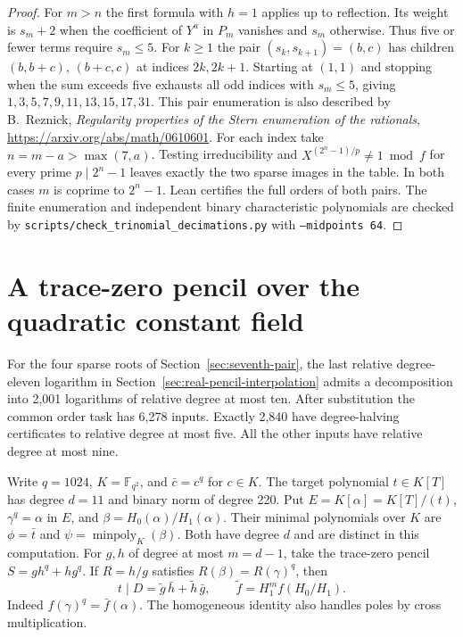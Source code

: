\documentclass[11pt]{article}
\begin{document}
\begin{proof}
For \(m>n\) the first formula with \(h=1\) applies up to reflection.
Its weight is \(s_m+2\) when the coefficient of \(Y^a\) in \(P_m\)
vanishes and \(s_m\) otherwise. Thus five or fewer terms require
\(s_m\le5\). For \(k\ge1\) the pair \((s_k,s_{k+1})=(b,c)\) has
children \((b,b+c)\), \((b+c,c)\) at indices \(2k,2k+1\). Starting
at \((1,1)\) and stopping when the sum exceeds five exhausts all odd
indices with \(s_m\le5\), giving
\(1,3,5,7,9,11,13,15,17,31\). This pair enumeration is also described
by B.~Reznick, \emph{Regularity properties of the Stern enumeration of
the rationals}, \url{https://arxiv.org/abs/math/0610601}.
For each index take \(n=m-a>\max(7,a)\). Testing irreducibility and
\(X^{(2^n-1)/p}\ne1\bmod f\) for every prime \(p\mid 2^n-1\) leaves
exactly the two sparse images in the table. In both cases \(m\) is
coprime to \(2^n-1\). Lean certifies the full orders of both pairs. The finite enumeration
and independent binary characteristic polynomials are checked by
\nolinkurl{scripts/check_trinomial_decimations.py} with
\texttt{--midpoints 64}.
\end{proof}

\section{A trace-zero pencil over the quadratic constant field}
\label{sec:decic-pencil}
For the four sparse roots of Section~\ref{sec:seventh-pair}, the last
relative degree-eleven logarithm in Section~\ref{sec:real-pencil-interpolation}
admits a decomposition into 2,001 logarithms of relative degree at
most ten. After substitution the common order task has 6,278 inputs.
Exactly 2,840 have degree-halving certificates to relative degree at
most five. All the other inputs have relative degree at most nine.

Write \(q=1024\), \(K=\mathbb F_{q^2}\), and \(\bar c=c^q\) for
\(c\in K\). The target polynomial \(t\in K[T]\) has degree \(d=11\)
and binary norm of degree 220. Put \(E=K[\alpha]=K[T]/(t)\),
\(\gamma^q=\alpha\) in \(E\), and \(\beta=H_0(\alpha)/H_1(\alpha)\).
Their minimal polynomials over \(K\) are \(\phi=\bar t\) and
\(\psi=\operatorname{minpoly}_K(\beta)\). Both have degree \(d\)
and are distinct in this computation. For \(g,h\) of degree at most
\(m=d-1\), take the trace-zero pencil \(S=g h^q+h g^q\). If
\(R=h/g\) satisfies \(R(\beta)=R(\gamma)^q\), then
\[
 t\mid D=\widetilde g\,\bar h+\widetilde h\,\bar g,\qquad
 \widetilde f=H_1^m f(H_0/H_1).
\]
Indeed \(f(\gamma)^q=\bar f(\alpha)\). The homogeneous identity
also handles poles by cross multiplication.
\end{document}
